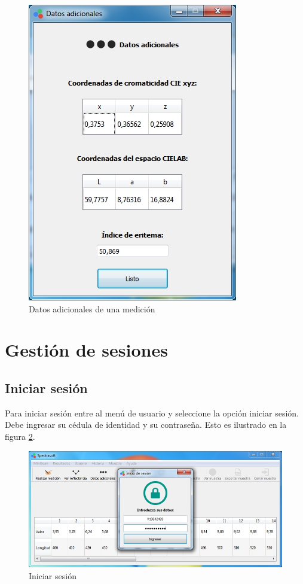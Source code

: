 \begin{figure}[H]
  \centering
  \includegraphics[width=.6\linewidth]{./img/resultados-adicionales.jpg}
\caption[]{Datos adicionales de una medici\'{o}n\label{fig:resultados-adicionales}}
\end{figure}
\vfill
\newpage

\section*{Gesti\'{o}n de sesiones}

	\subsection*{Iniciar sesi\'{o}n}
	
	Para iniciar sesi\'{o}n entre al men\'{u} de usuario y seleccione la opci\'{o}n iniciar sesi\'{o}n. Debe ingresar su c\'{e}dula de identidad y su contrase\~{n}a. Esto es ilustrado en la figura \ref{fig:iniciar-sesion}.
	
\begin{figure}[H]
  \centering
  \includegraphics[width=1\linewidth]{./img/inicio-sesion.jpg}
\caption[]{Iniciar sesi\'{o}n\label{fig:iniciar-sesion}}
\end{figure}
	
